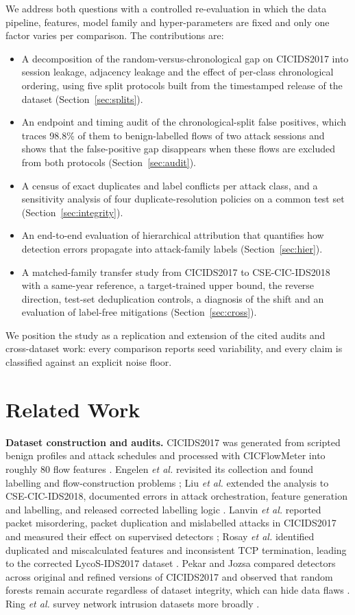 \documentclass[conference]{IEEEtran}
\begin{document}
We address both questions with a controlled re-evaluation in which the data pipeline, features, model family and hyper-parameters are fixed and only one factor varies per comparison. The contributions are:
\begin{itemize}
\item A decomposition of the random-versus-chronological gap on CICIDS2017 into session leakage, adjacency leakage and the effect of per-class chronological ordering, using five split protocols built from the timestamped release of the dataset (Section~\ref{sec:splits}).
\item An endpoint and timing audit of the chronological-split false positives, which traces 98.8\% of them to benign-labelled flows of two attack sessions and shows that the false-positive gap disappears when these flows are excluded from both protocols (Section~\ref{sec:audit}).
\item A census of exact duplicates and label conflicts per attack class, and a sensitivity analysis of four duplicate-resolution policies on a common test set (Section~\ref{sec:integrity}).
\item An end-to-end evaluation of hierarchical attribution that quantifies how detection errors propagate into attack-family labels (Section~\ref{sec:hier}).
\item A matched-family transfer study from CICIDS2017 to CSE-CIC-IDS2018 with a same-year reference, a target-trained upper bound, the reverse direction, test-set deduplication controls, a diagnosis of the shift and an evaluation of label-free mitigations (Section~\ref{sec:cross}).
\end{itemize}
We position the study as a replication and extension of the cited audits and cross-dataset work: every comparison reports seed variability, and every claim is classified against an explicit noise floor.

\section{Related Work}

\textbf{Dataset construction and audits.} CICIDS2017 was generated from scripted benign profiles and attack schedules and processed with CICFlowMeter into roughly 80 flow features \cite{sharafaldin2018}. Engelen \textit{et al.} revisited its collection and found labelling and flow-construction problems \cite{engelen2021}; Liu \textit{et al.} extended the analysis to CSE-CIC-IDS2018, documented errors in attack orchestration, feature generation and labelling, and released corrected labelling logic \cite{liu2022}. Lanvin \textit{et al.} reported packet misordering, packet duplication and mislabelled attacks in CICIDS2017 and measured their effect on supervised detectors \cite{lanvin2023}; Rosay \textit{et al.} identified duplicated and miscalculated features and inconsistent TCP termination, leading to the corrected LycoS-IDS2017 dataset \cite{rosay2022}. Pekar and Jozsa compared detectors across original and refined versions of CICIDS2017 and observed that random forests remain accurate regardless of dataset integrity, which can hide data flaws \cite{pekar2024}. Ring \textit{et al.} survey network intrusion datasets more broadly \cite{ring2019}.
\end{document}

